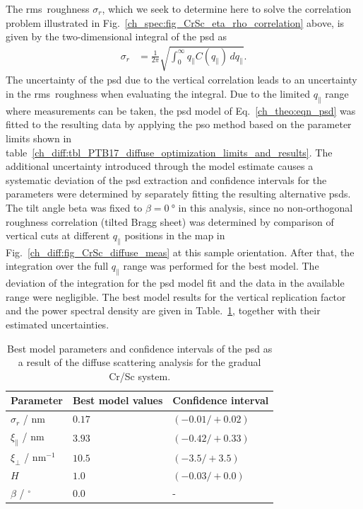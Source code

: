 The \gls{rms}~roughness $\sigma_r$, which we seek to determine here to solve the correlation problem illustrated in Fig.~\ref{ch_spec:fig_CrSc_eta_rho_correlation} above, is given by the two-dimensional integral of the \gls{psd} as
\begin{align}
\sigma_r &=\frac{1}{2\pi} \sqrt{\int_{0}^{\infty} q_\parallel C(q_\parallel) \, 
dq_\parallel} \text{.}
\end{align}
The uncertainty of the \gls{psd} due to the vertical correlation leads to an 
uncertainty in the \gls{rms}~roughness when evaluating the integral. Due to the 
limited $q_\parallel$ range where measurements can be taken, the 
\gls{psd} model of Eq.~\eqref{ch_theo:eqn_psd} was fitted to the resulting data by applying the \gls{pso} method based on the parameter limits shown in table~\ref{ch_diff:tbl_PTB17_diffuse_optimization_limits_and_results}. The additional uncertainty introduced through the model estimate causes a systematic deviation of the \gls{psd} extraction and confidence intervals for the parameters were determined by separately fitting the resulting alternative \gls{psd}s. The tilt angle beta was fixed to $\beta=\SI{0}{\degree}$ in this analysis, since no non-orthogonal roughness correlation (tilted Bragg sheet) was determined by comparison of vertical cuts at different $q_\parallel$ positions in the map in Fig.~\ref{ch_diff:fig_CrSc_diffuse_meas} at this sample orientation. After that, the integration over the full $q_\parallel$ range was performed for the best model. The deviation of the integration for the \gls{psd} model fit and the data in the available range were negligible. The best model results for the vertical replication factor and the power spectral 
density are given in Table.~\ref{ch_diff:tbl_CrSc_psd_results}, together with their estimated
uncertainties.
\begin{table}
\centering
\caption[Best model parameters and confidence intervals of the PSD for the gradual Cr/Sc system.]{Best model parameters and confidence intervals of the \gls{psd} as a result of the diffuse scattering analysis for the gradual Cr/Sc system.}
\label{ch_diff:tbl_CrSc_psd_results}
\begin{tabular}{@{}lll@{}}
\toprule
Parameter & Best model values & Confidence interval\\ \midrule
$\sigma_r$ / nm & $0.17  $&$(-0.01/+0.02)$ \\
$\xi_\parallel$ / nm& $3.93 $&$(-0.42 / +0.33)$ \\
$\xi_\perp$  / nm$^{-1}$& $10.5 $&$ (-3.5/+3.5)$ \\
$H$ & $1.0$ & $(-0.03 /+0.0)$ \\
$\beta$ / $^\circ$ & $0.0$ & - \\
 \bottomrule
\end{tabular}
\end{table}

